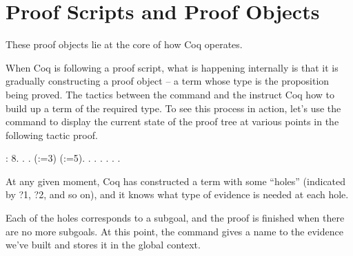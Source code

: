 \documentclass[12pt]{report}
\begin{document}
\section{Proof Scripts and Proof Objects}



 These proof objects lie at the core of how Coq operates. 


    When Coq is following a proof script, what is happening internally
    is that it is gradually constructing a proof object -- a term
    whose type is the proposition being proved.  The tactics between
    the  command and the  instruct Coq how to build up a
    term of the required type.  To see this process in action, let's
    use the   command to display the current state of the
    proof tree at various points in the following tactic proof. \begin{coqdoccode}
\coqdocemptyline
\coqdocnoindent
{} :  8.\coqdoceol
\coqdocnoindent
{}.\coqdoceol
\coqdocindent{1.50em}
 .\coqdoceol
\coqdocindent{1.50em}
   (:=3) (:=5).\coqdoceol
\coqdocindent{1.50em}
 .\coqdoceol
\coqdocindent{1.50em}
 .\coqdoceol
\coqdocindent{1.50em}
 .\coqdoceol
\coqdocindent{1.50em}
 .\coqdoceol
\coqdocindent{1.50em}
 .\coqdoceol
\coqdocnoindent
{}.\coqdoceol
\coqdocemptyline
\end{coqdoccode}
At any given moment, Coq has constructed a term with some
    ``holes'' (indicated by ?1, ?2, and so on), and it knows what
    type of evidence is needed at each hole.  



    Each of the holes corresponds to a subgoal, and the proof is
    finished when there are no more subgoals.  At this point, the
     command gives a name to the evidence we've built and
    stores it in the global context. 
\end{document}
